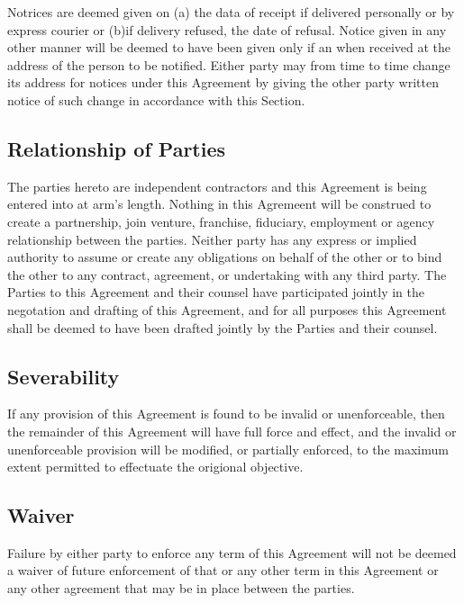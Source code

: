 \documentclass[letterpaper,10pt,english]{sphinxmanual}
\begin{document}
Notrices are deemed given on (a) the data of receipt if delivered personally or by express courier or (b)if delivery refused, the date of refusal. Notice given in any other manner will be deemed to have been given only if an when received at the address of the person to be notified. Either party may from time to time change its address for notices under this Agreement by giving the other party written notice of such change in accordance with this Section.


\subsection{Relationship of Parties}
\label{\detokenize{7-miscellaneous:relationship-of-parties}}
The parties hereto are independent      contractors and this Agreement is being entered into at arm’s length. Nothing in this Agremeent will be construed to create a partnership, join venture, franchise, fiduciary, employment or agency relationship between the parties. Neither party has any express or implied authority to assume or create any obligations on behalf of the other or to bind the other to any contract, agreement, or undertaking with any third party. The Parties to this Agreement and their counsel have participated jointly in the negotation and drafting of this Agreement, and for all purposes this Agreement shall be deemed to have been drafted jointly by the Parties and their counsel.


\subsection{Severability}
\label{\detokenize{7-miscellaneous:severability}}
If any provision of this Agreement is found to be invalid or unenforceable, then the remainder of this Agreement will have full force and effect, and the invalid or unenforceable provision will be modified, or partially enforced, to the maximum extent permitted to effectuate the origional objective.


\subsection{Waiver}
\label{\detokenize{7-miscellaneous:waiver}}
Failure by either party to enforce any term of this Agreement will not be deemed a waiver of future enforcement of that or any other term in this Agreement or any other agreement that may be in place between the parties.
\end{document}
